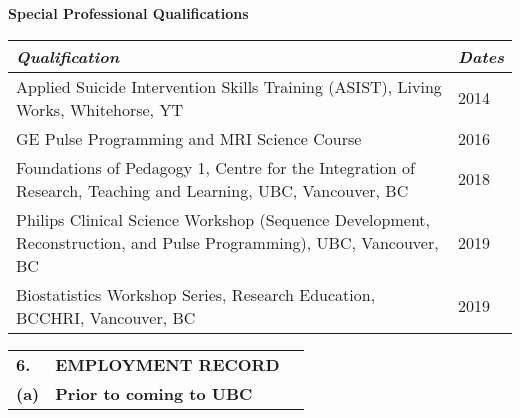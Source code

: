 \documentclass[11pt,notitlepage,english]{report}
\begin{document}

\textbf{Special Professional Qualifications}

\begin{table}[h]
  \begin{tabularx}{1\textwidth}{|p{15.6cm}|X|}
    \hline
    \textit{Qualification}                                                                                                           & \textit{Dates} \\
    \hline
    Applied Suicide Intervention Skills Training (ASIST), Living Works, Whitehorse, YT                                               & 2014           \\
    \hline
    GE Pulse Programming and MRI Science Course                                                                                      & 2016           \\
    \hline
    Foundations of Pedagogy 1, Centre for the Integration of Research, Teaching and Learning, UBC, Vancouver, BC                     & 2018           \\
    \hline
    \raggedright Philips Clinical Science Workshop (Sequence Development, Reconstruction, and Pulse Programming), UBC, Vancouver, BC & 2019           \\
    \hline
    Biostatistics Workshop Series, Research Education, BCCHRI, Vancouver, BC                                                         & 2019           \\
    \hline
  \end{tabularx}
\end{table}


\begin{tabular}{L{.5cm} L{8cm} L{6.9cm}}
  \textbf{6.}  & \textbf{EMPLOYMENT RECORD}      \\
  \textbf{(a)} & \textbf{Prior to coming to UBC} \\
\end{tabular}
\end{document}
